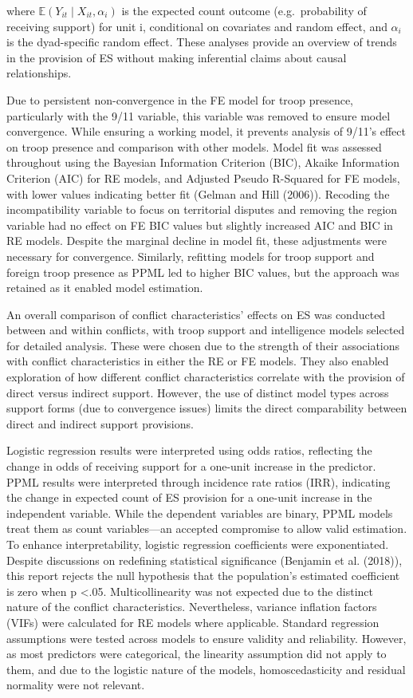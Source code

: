 \documentclass[
]{article}
\begin{document}
where \(\mathbb{E}(Y_{it} \mid X_{it}, \alpha_i)\) is the expected count
outcome (e.g.~probability of receiving support) for unit i, conditional
on covariates and random effect, and \(\alpha_i\) is the dyad-specific
random effect. These analyses provide an overview of trends in the
provision of ES without making inferential claims about causal
relationships.

Due to persistent non-convergence in the FE model for troop presence,
particularly with the 9/11 variable, this variable was removed to ensure
model convergence. While ensuring a working model, it prevents analysis
of 9/11's effect on troop presence and comparison with other models.
Model fit was assessed throughout using the Bayesian Information
Criterion (BIC), Akaike Information Criterion (AIC) for RE models, and
Adjusted Pseudo R-Squared for FE models, with lower values indicating
better fit (Gelman and Hill (2006)). Recoding the incompatibility
variable to focus on territorial disputes and removing the region
variable had no effect on FE BIC values but slightly increased AIC and
BIC in RE models. Despite the marginal decline in model fit, these
adjustments were necessary for convergence. Similarly, refitting models
for troop support and foreign troop presence as PPML led to higher BIC
values, but the approach was retained as it enabled model estimation.

An overall comparison of conflict characteristics' effects on ES was
conducted between and within conflicts, with troop support and
intelligence models selected for detailed analysis. These were chosen
due to the strength of their associations with conflict characteristics
in either the RE or FE models. They also enabled exploration of how
different conflict characteristics correlate with the provision of
direct versus indirect support. However, the use of distinct model types
across support forms (due to convergence issues) limits the direct
comparability between direct and indirect support provisions.

Logistic regression results were interpreted using odds ratios,
reflecting the change in odds of receiving support for a one-unit
increase in the predictor. PPML results were interpreted through
incidence rate ratios (IRR), indicating the change in expected count of
ES provision for a one-unit increase in the independent variable. While
the dependent variables are binary, PPML models treat them as count
variables---an accepted compromise to allow valid estimation. To enhance
interpretability, logistic regression coefficients were exponentiated.
Despite discussions on redefining statistical significance (Benjamin et
al. (2018)), this report rejects the null hypothesis that the
population's estimated coefficient is zero when p \textless.05.
Multicollinearity was not expected due to the distinct nature of the
conflict characteristics. Nevertheless, variance inflation factors
(VIFs) were calculated for RE models where applicable. Standard
regression assumptions were tested across models to ensure validity and
reliability. However, as most predictors were categorical, the linearity
assumption did not apply to them, and due to the logistic nature of the
models, homoscedasticity and residual normality were not relevant.
\end{document}
